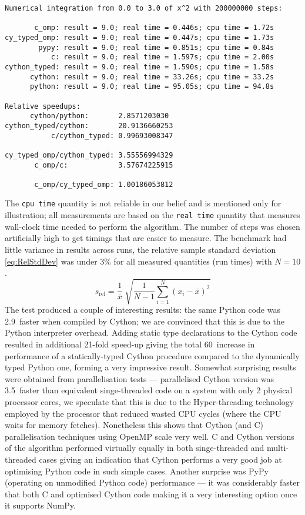 \begin{Verbatim}[label=typical benchmark run,frame=single]
Numerical integration from 0.0 to 3.0 of x^2 with 200000000 steps:

       c_omp: result = 9.0; real time = 0.446s; cpu time = 1.72s
cy_typed_omp: result = 9.0; real time = 0.447s; cpu time = 1.73s
        pypy: result = 9.0; real time = 0.851s; cpu time = 0.84s
           c: result = 9.0; real time = 1.597s; cpu time = 2.00s
cython_typed: result = 9.0; real time = 1.590s; cpu time = 1.58s
      cython: result = 9.0; real time = 33.26s; cpu time = 33.2s
      python: result = 9.0; real time = 95.05s; cpu time = 94.8s

Relative speedups:
      cython/python:       2.8571203030
cython_typed/cython:       20.9136660253
           c/cython_typed: 0.99693008347

cy_typed_omp/cython_typed: 3.55556994329
       c_omp/c:            3.57674225915

       c_omp/cy_typed_omp: 1.00186053812
\end{Verbatim}
The \verb|cpu time| quantity is not reliable in our belief and is mentioned only for illustration;
all measurements are based on the \verb|real time| quantity that measures wall-clock time needed to
perform the algorithm. The number of steps was chosen artificially high to get timings that are
easier to measure.
The benchmark had little variance in results across runs, the relative sample standard deviation
\eqref{eq:RelStdDev} was under 3\% for all measured quantities (run times) with \(N = 10\).
\begin{equation} \label{eq:RelStdDev}
	s_{\text{rel}} = \frac{1}{\overline{x}} \; \sqrt{\frac{1}{N-1} \sum_{i=1}^N (x_i - \overline{x})^2}
\end{equation}
The test produced a couple of interesting results: the same Python code was 2.9\x\ faster
when compiled by Cython; we are convinced that this is due to the Python interpreter overhead. Adding
static type declarations to the Cython code resulted in additional 21-fold speed-up giving the total
60\x\ increase in performance of a statically-typed Cython procedure compared to the dynamically
typed Python one, forming a very impressive result. Somewhat surprising results were obtained from
parallelisation tests --- parallelised Cython version was 3.5\x\ faster than equivalent
singe-threaded code on a system with only 2 physical processor cores, we speculate that this is due
to the Hyper-threading technology employed by the processor that reduced wasted CPU cycles (where
the CPU waits for memory fetches). Nonetheless this shows that Cython (and C) parallelisation techniques
using OpenMP scale very well. C and Cython versions of the algorithm performed virtually equally
in both singe-threaded and multi-threaded cases giving an indication that Cython performs a very good
job at optimising Python code in such simple cases. Another surprise was PyPy (operating on
unmodified Python code) performance --- it was considerably faster that both C and optimised Cython
code making it a very interesting option once it supports NumPy.

